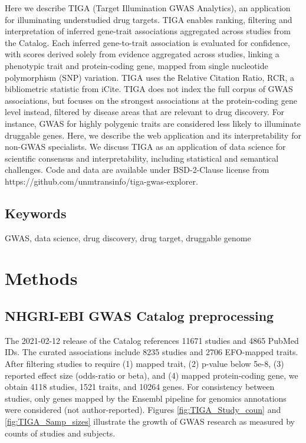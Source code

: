 Here we describe TIGA (Target Illumination GWAS Analytics), an application for illuminating understudied drug targets. TIGA enables ranking, filtering and interpretation of inferred gene-trait associations aggregated across studies from the Catalog. Each inferred gene-to-trait association is evaluated for confidence, with scores derived solely from evidence aggregated across studies, linking a phenotypic trait and protein-coding gene, mapped from single nucleotide polymorphism (SNP) variation. TIGA uses the Relative Citation Ratio, RCR\cite{Hutchins2016-hs}, a bibliometric statistic from iCite\cite{Hutchins2019-ue}. TIGA does not index the full corpus of GWAS associations, but focuses on the strongest associations at the protein-coding gene level instead, filtered by disease areas that are relevant to drug discovery. For instance, GWAS for highly polygenic traits are considered less likely to illuminate druggable genes. Here, we describe the web application and its interpretability for non-GWAS specialists. We discuss TIGA as an application of data science for scientific consensus and interpretability, including statistical and semantical challenges. Code and data are available under BSD-2-Clause license from https://github.com/unmtransinfo/tiga-gwas-explorer.

\subsection{Keywords}

GWAS, data science, drug discovery, drug target, druggable genome

\section{Methods}

\subsection{NHGRI-EBI GWAS Catalog preprocessing}

The 2021-02-12 release of the Catalog references 11671 studies and 4865 PubMed IDs. The curated associations include 8235 studies and 2706 EFO-mapped traits. After filtering studies to require (1) mapped trait, (2) p-value below 5e-8, (3) reported effect size (odds-ratio or beta), and (4) mapped protein-coding gene, we obtain 4118 studies, 1521 traits, and 10264 genes. For consistency between studies, only genes mapped by the Ensembl pipeline for genomics annotations were considered (not author-reported). Figures \ref{fig:TIGA_Study_coun} and \ref{fig:TIGA_Samp_sizes} illustrate the growth of GWAS research as measured by counts of studies and subjects.  

